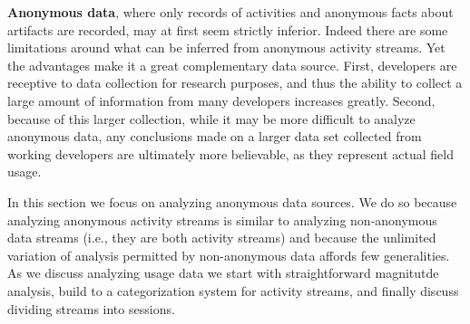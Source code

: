 \vspace{0.1in}

\noindent
{\bf Anonymous data}, where only records of activities and anonymous facts about artifacts are recorded, may at first seem strictly inferior. Indeed there are some limitations around what can be inferred from anonymous activity streams. Yet the advantages make it a great complementary data source. First, developers are receptive to data collection for research purposes, and thus the ability to collect a large amount of information from many developers increases greatly. Second, because of this larger collection, while it may be more difficult to analyze anonymous data, any conclusions made on a larger data set collected from working developers are ultimately more believable, as they represent actual field usage. 

In this section we focus on analyzing anonymous data sources. We do so because analyzing anonymous activity streams is similar to analyzing non-anonymous data streams (i.e., they are both activity streams) and because the unlimited variation of analysis permitted by non-anonymous data affords few generalities. As we discuss analyzing usage data we start with straightforward magnitutde analysis, build to a categorization system for activity streams, and finally discuss dividing streams into sessions. 
